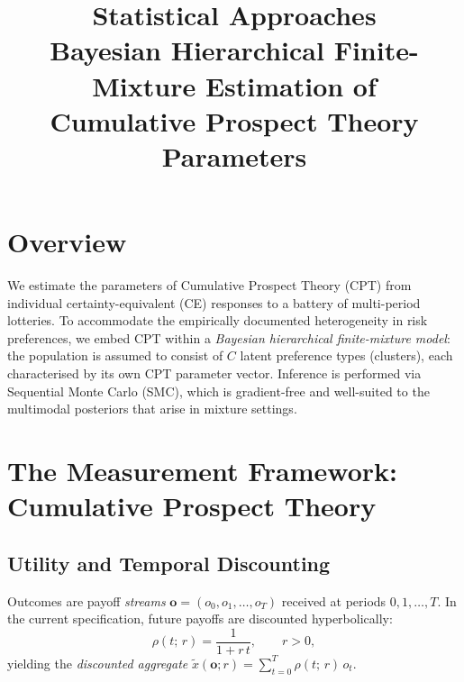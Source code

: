 \documentclass[12pt, a4paper]{article}
\title{\textbf{Statistical Approaches}\\[4pt]
       \large Bayesian Hierarchical Finite-Mixture Estimation of\\
       Cumulative Prospect Theory Parameters}
\author{}
\date{}
\begin{document}
\maketitle
\tableofcontents
\newpage

\section{Overview}

We estimate the parameters of Cumulative Prospect Theory (CPT) from individual
certainty-equivalent (CE) responses to a battery of multi-period lotteries.
To accommodate the empirically documented heterogeneity in risk preferences, we
embed CPT within a \emph{Bayesian hierarchical finite-mixture model}: the
population is assumed to consist of $C$ latent preference types (clusters), each
characterised by its own CPT parameter vector.  Inference is performed via
Sequential Monte Carlo (SMC), which is gradient-free and well-suited to the
multimodal posteriors that arise in mixture settings.

\section{The Measurement Framework: Cumulative Prospect Theory}
\label{sec:cpt}

\subsection{Utility and Temporal Discounting}

Outcomes are payoff \emph{streams} $\mathbf{o} = (o_0, o_1, \ldots, o_T)$
received at periods $0, 1, \ldots, T$.  In the current specification, future
payoffs are discounted hyperbolically:
\begin{equation}
  \rho(t;\, r) = \frac{1}{1+r\,t}, \qquad r > 0,
  \label{eq:discount}
\end{equation}
yielding the \emph{discounted aggregate}
$\tilde{x}(\mathbf{o}; r) = \sum_{t=0}^{T} \rho(t;\,r)\,o_t$.
\end{document}
